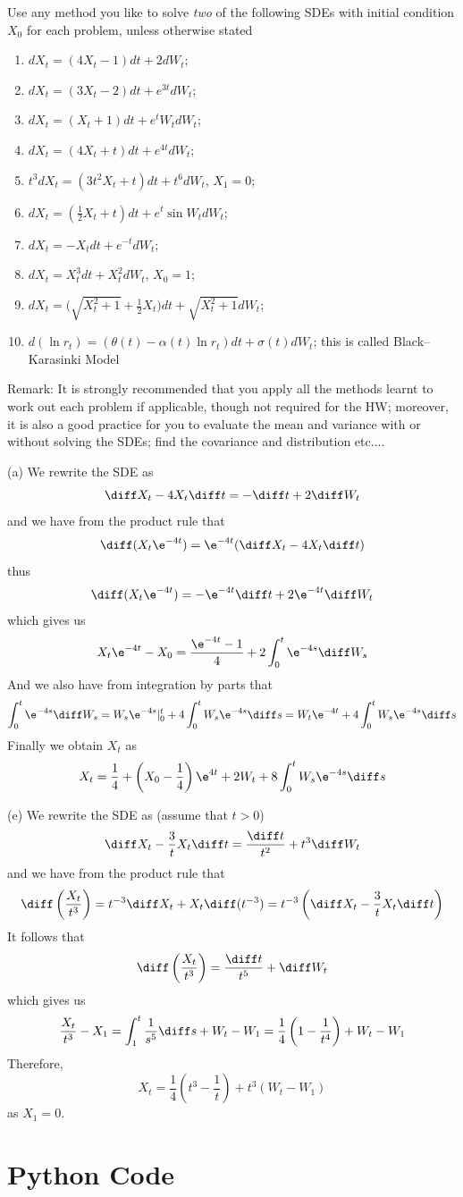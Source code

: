     \problem
    \begin{question}
        Use any method you like to solve \emph{two} of the following SDEs with initial condition $X_0$ for each problem, unless otherwise stated
        \begin{enumerate}[label=(\alph*)]
        \item $dX_t=(4X_t-1)dt+2dW_t$;
        \item $dX_t=(3X_t-2)dt+e^{3t}dW_t$;
        \item $dX_t=(X_t+1)dt+e^t W_t dW_t$;
        \item $dX_t=(4X_t+t)dt+e^{4t}dW_t$;
        \item $t^3 dX_t=(3t^2X_t+t)dt+t^6dW_t$, $X_1=0$;
        \item $dX_t=(\frac{1}{2}X_t+t)dt+e^t \sin W_tdW_t$;
        \item $dX_t=-X_tdt+e^{-t}dW_t$;
        \item $dX_t=X_t^3dt+X_t^2dW_t$, $X_0=1$;
        \item $dX_t=\Big(\sqrt{X^2_t+1}+\frac{1}{2}X_t\Big)dt+\sqrt{X^2_t+1}dW_t$;
        \item $d(\ln r_t)=(\theta(t)-\alpha(t)\ln r_t)dt+\sigma(t)dW_t$;  this is called Black--Karasinki Model
        \end{enumerate}
        Remark: It is strongly recommended that you apply all the methods learnt to work out each problem if applicable, though not required for the HW; moreover, it is also a good practice for you to evaluate the mean and variance with or without solving the SDEs; find the covariance and distribution etc....
    \end{question}
    \begin{subproblem}
        \item[(a)]
        We rewrite the SDE as
        \[\diff X_t-4X_t\diff t=-\diff t+2\diff W_t\]
        and we have from the product rule that
        \[\diff(X_t\e^{-4t})=\e^{-4t}(\diff X_t-4X_t\diff t)\]
        thus
        \[\diff(X_t\e^{-4t})=-\e^{-4t}\diff t+2\e^{-4t}\diff W_t\]
        which gives us
        \[X_t\e^{-4t}-X_0=\frac{\e^{-4t}-1}{4}+2\int_0^t\e^{-4s}\diff W_s\]
        And we also have from integration by parts that
        \[\int_0^t\e^{-4s}\diff W_s=W_s\e^{-4s}|_0^t+4\int_0^tW_s\e^{-4s}\diff s
        =W_t\e^{-4t}+4\int_0^tW_s\e^{-4s}\diff s\]
        Finally we obtain $X_t$ as
        \[X_t=\frac{1}{4}+\left(X_0-\frac{1}{4}\right)\e^{4t}+2W_t+8\int_0^tW_s\e^{-4s}\diff s\]

        \item[(e)]
        We rewrite the SDE as (assume that $t>0$)
        \[\diff X_t-\frac{3}{t}X_t\diff t=\frac{\diff t}{t^2}+t^3\diff W_t\]
        and we have from the product rule that
        \[\diff\left(\frac{X_t}{t^3}\right)=t^{-3}\diff X_t+X_t\diff(t^{-3})
        =t^{-3}\left(\diff X_t-\frac{3}{t}X_t\diff t\right)\]
        It follows that
        \[\diff\left(\frac{X_t}{t^3}\right)=\frac{\diff t}{t^5}+\diff W_t\]
        which gives us
        \[\frac{X_t}{t^3}-X_1=\int_1^t\frac{1}{s^5}\diff s+W_t-W_1
        =\frac{1}{4}\left(1-\frac{1}{t^4}\right)+W_t-W_1\]
        Therefore,
        \[X_t=\frac{1}{4}\left(t^3-\frac{1}{t}\right)+t^3(W_t-W_1)\]
        as $X_1=0$.
    \end{subproblem}

    \appendix
    \section{Python Code}
    
